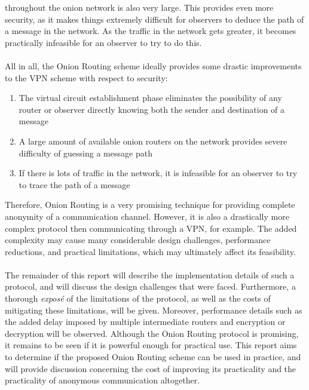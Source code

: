 \documentclass[10pt]{report}
\begin{document}
throughout the onion network is also very large. This provides even more security, as it makes
things extremely difficult for observers to deduce the path of a message in the network. As the
traffic in the network gets greater, it becomes practically infeasible for an observer to try to do
this.\\\\
All in all, the Onion Routing scheme ideally provides some drastic improvements to the VPN scheme
with respect to security:
\begin{enumerate}
	\item The virtual circuit establishment phase eliminates the possibility of any router or
		observer directly knowing both the sender and destination of a message
	\item A large amount of available onion routers on the network provides severe difficulty of
		guessing a message path
	\item If there is lots of traffic in the network, it is infeasible for an observer to try to
		trace the path of a message
\end{enumerate}
Therefore, Onion Routing is a very promising technique for providing complete anonymity of a
communication channel. However, it is also a drastically more complex protocol then communicating
through a VPN, for example. The added complexity may cause many considerable design challenges,
performance reductions, and practical limitations, which may ultimately affect its feasibility.\\\\
The remainder of this report will describe the implementation details of such a protocol, and will
discuss the design challenges that were faced. Furthermore, a thorough \textit{expos\'e} of the
limitations of the protocol, as well as the costs of mitigating these limitations, will be given.
Moreover, performance details such as the added delay imposed by multiple intermediate routers and
encryption or decryption will be observed. Although the Onion Routing protocol is promising, it
remains to be seen if it is powerful enough for practical use. This report aims to determine if the
proposed Onion Routing scheme can be used in practice, and will provide discussion concerning the
cost of improving its practicality and the practicality of anonymous communication altogether.
\end{document}
